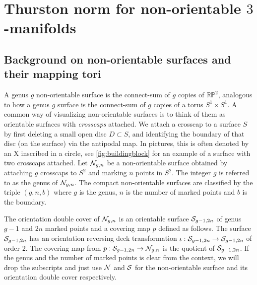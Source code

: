 \section{Thurston norm for non-orientable $3$-manifolds}
\label{sec:thur-norm-non-orientable}

\subsection{Background on non-orientable surfaces and their mapping tori}
\label{sec:backgr-non-orient}

A genus $g$ non-orientable surface is the connect-sum of $g$ copies of
$\mathbb{RP}^2$, analogous to how a genus $g$ surface is the connect-sum of $g$ copies of a torus
$S^1 \times S^1$.  A common way of visualizing non-orientable surfaces is to think of them as orientable
surfaces with \emph{crosscaps} attached. We attach a crosscap to a surface $S$ by first deleting a small open disc $D\subset S$, and
identifying the boundary of that disc (on the surface) via the antipodal map. In pictures, this is often denoted by
an X inscribed in a circle, see \autoref{fig:buildingblock} for an example of a surface with two crosscaps
attached.  Let $\mathcal{N}_{g,n}$ be a non-orientable surface obtained by attaching $g$ crosscaps to $S^2$ and marking $n$ points in $S^2$.  The integer $g$ is referred to as the genus of $\mathcal{N}_{g,n}$.  The compact non-orientable surfaces are classified by the triple $(g,n,b)$ where $g$ is the genus, $n$ is the number of marked points and $b$ is the boundary.

 The orientation double cover of $\mathcal{N}_{g,n}$ is an orientable surface $\mathcal{S}_{g-1, 2n}$ of genus $g-1$ and $2n$ marked points and a covering map $p$ defined as follows. The surface $\mathcal{S}_{g-1,2n}$ has an orientation reversing deck transformation $\iota: \mathcal{S}_{g-1, 2n} \to \mathcal{S}_{g-1,
  2n}$ of order 2. The covering map from $p:\mathcal{S}_{g-1,2n}\to \mathcal{N}_{g,n}$ is the quotient of $\mathcal{S}_{g-1,2n}$. If the genus and the
number of marked points is clear from the context, we will drop the subscripts and just use
$\mathcal{N}$ and $\mathcal{S}$ for the non-orientable surface and its orientation double cover respectively.

